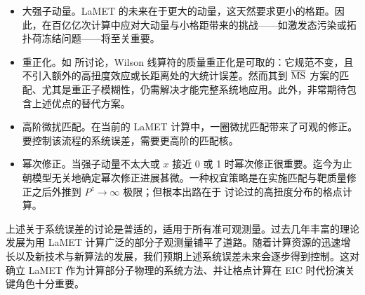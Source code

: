 \begin{itemize}

	\item 大强子动量。LaMET 的未来在于更大的动量，这天然要求更小的格距。因此，在百亿亿次计算中应对大动量与小格距带来的挑战——如激发态污染或拓扑荷冻结问题——将至关重要。

	\item 重正化。如  所讨论，Wilson 线算符的质量重正化是可取的：它规范不变，且不引入额外的高扭度效应或长距离处的大统计误差。然而其到 ${\overline{\rm MS}}$ 方案的匹配、尤其是重正子模糊性，仍需解决才能完整系统地应用。此外，非常期待包含上述优点的替代方案。

	\item 高阶微扰匹配。在当前的 LaMET 计算中，一圈微扰匹配带来了可观的修正。要控制该流程的系统误差，需要更高阶的匹配核。

	\item 幂次修正。当强子动量不太大或 $x$ 接近 0 或 1 时幂次修正很重要。迄今为止朝模型无关地确定幂次修正进展甚微。一种权宜策略是在实施匹配与靶质量修正之后外推到 $P^z\to\infty$ 极限；但根本出路在于  讨论过的高扭度分布的格点计算。

\end{itemize}

上述关于系统误差的讨论是普适的，适用于所有准可观测量。过去几年丰富的理论发展为用 LaMET 计算广泛的部分子观测量铺平了道路。随着计算资源的迅速增长以及新技术与新算法的发展，我们预期上述系统误差未来会逐步得到控制。这对确立 LaMET 作为计算部分子物理的系统方法、并让格点计算在 EIC 时代扮演关键角色十分重要。


